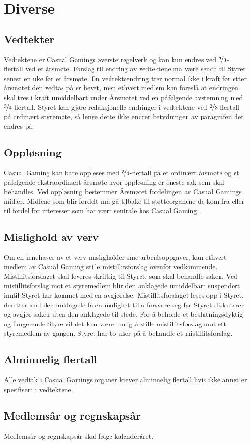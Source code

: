 \chapter{Diverse}

\section{Vedtekter}
Vedtektene er Casual Gamings øverste regelverk og kan kun endres ved $\nicefrac{2}{3}$-flertall ved et årsmøte. Forslag til endring av vedtektene må være sendt til Styret senest en uke før et årsmøte. En vedtektsendring trer normal ikke i kraft før etter årsmøtet den vedtas på er hevet, men ethvert medlem kan foreslå at endringen skal tres i kraft umiddelbart under Årsmøtet ved en påfølgende avstemning med $\nicefrac{3}{4}$-flertall. Styret kan gjøre redaksjonelle endringer i vedtektene ved $\nicefrac{2}{3}$-flertall på ordinært styremøte, så lenge dette ikke endrer betydningen av paragrafen det endres på.

\section{Oppløsning}
Casual Gaming kan bare oppløses med $\nicefrac{3}{4}$-flertall på et ordinært årsmøte og et påfølgende ekstraordinært årsmøte hvor oppløsning er eneste sak som skal behandles. Ved oppløsning bestemmer Årsmøtet fordelingen av Casual Gamings midler. Midlene som blir fordelt må gå tilbake til støtteorganene de kom fra eller til fordel for interesser som har vært sentrale hos Casual Gaming.

\section{Mislighold av verv}
Om en innehaver av et verv misligholder sine arbeidsoppgaver, kan ethvert medlem av Casual Gaming stille mistillitsforslag ovenfor vedkommende. Mistillitsforslaget skal leveres skriftlig til Styret, som skal behandle saken. Ved mistillitsforslag mot et styremedlem blir den anklagede umiddelbart suspendert inntil Styret har kommet med en avgjørelse. Mistillitsforslaget leses opp i Styret, deretter skal den anklagede få en mulighet til å forsvare seg før Styret diskuterer og avgjør saken uten den anklagede til stede. For å beholde et beslutningsdyktig og fungerende Styre vil det kun være mulig å stille mistillitsforslag mot ett styremedlem av gangen. Styret har to uker på å behandle et mistillitsforslag.

\section{Alminnelig flertall}
Alle vedtak i Casual Gamings organer krever alminnelig flertall hvis ikke annet er spesifisert i vedtektene.

\section{Medlemsår og regnskapsår}
Medlemsår og regnskapsår skal følge kalenderåret.
